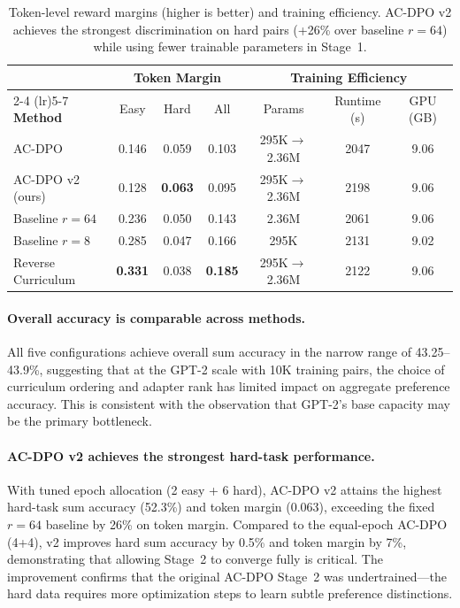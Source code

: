 \documentclass{article}
\begin{document}
\begin{table}[t]
\caption{Token-level reward margins (higher is better) and training efficiency. AC-DPO v2 achieves the strongest discrimination on hard pairs (+26\% over baseline $r{=}64$) while using fewer trainable parameters in Stage~1.}
\label{tab:margins}
\centering
\small
\begin{tabular}{l ccc ccc}
\toprule
& \multicolumn{3}{c}{\textbf{Token Margin}} & \multicolumn{3}{c}{\textbf{Training Efficiency}} \\
\cmidrule(lr){2-4} \cmidrule(lr){5-7}
\textbf{Method} & Easy & Hard & All & Params & Runtime (s) & GPU (GB) \\
\midrule
AC-DPO             & 0.146 & 0.059 & 0.103 & 295K$\rightarrow$2.36M & 2047 & 9.06 \\
AC-DPO v2 (ours)   & 0.128 & \textbf{0.063} & 0.095 & 295K$\rightarrow$2.36M & 2198 & 9.06 \\
Baseline $r{=}64$  & 0.236 & 0.050 & 0.143 & 2.36M & 2061 & 9.06 \\
Baseline $r{=}8$   & 0.285 & 0.047 & 0.166 & 295K & 2131 & 9.02 \\
Reverse Curriculum  & \textbf{0.331} & 0.038 & \textbf{0.185} & 295K$\rightarrow$2.36M & 2122 & 9.06 \\
\bottomrule
\end{tabular}
\end{table}

\paragraph{Overall accuracy is comparable across methods.}
All five configurations achieve overall sum accuracy in the narrow range of 43.25--43.9\%, suggesting that at the GPT-2 scale with 10K training pairs, the choice of curriculum ordering and adapter rank has limited impact on aggregate preference accuracy. This is consistent with the observation that GPT-2's base capacity may be the primary bottleneck.

\paragraph{AC-DPO v2 achieves the strongest hard-task performance.}
With tuned epoch allocation (2 easy + 6 hard), AC-DPO v2 attains the highest hard-task sum accuracy (52.3\%) and token margin (0.063), exceeding the fixed $r{=}64$ baseline by 26\% on token margin. Compared to the equal-epoch AC-DPO (4+4), v2 improves hard sum accuracy by 0.5\% and token margin by 7\%, demonstrating that allowing Stage~2 to converge fully is critical. The improvement confirms that the original AC-DPO Stage~2 was undertrained---the hard data requires more optimization steps to learn subtle preference distinctions.
\end{document}
